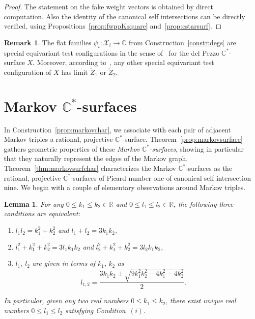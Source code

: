 \documentclass[10pt,a4paper]{amsart}
\newtheorem{lem}[thm]{Lemma}
\theoremstyle{definition}
\newtheorem{rem}[thm]{Remark}
\def\CC{{\mathbb C}}
\def\RR{{\mathbb R}}
\begin{document}
\begin{proof}
The statement on the fake weight vectors is
obtained by direct computation.
Also the identity of the canonical self
intersections can be directly verified,
using Propositions~\ref{prop:fwppKsquare}
and~\ref{prop:cstarsurf}.
\end{proof}


\begin{rem}
The flat families $\psi_i \colon \mathcal{X}_i \to \CC$
from Construction~\ref{constr:degs} are special equivariant
test configurations in the sense of~\cite[Definition~5.2]{HaHaSu}
for the del Pezzo $\CC^*$-surface $X$.
Moreover, according to~\cite[Proposition~5.4]{HaHaSu},
any other special equivariant test configuration of
$X$ has limit $\tilde Z_1$ or $\tilde Z_2$.
\end{rem}




\section[Markov C\^{}*-surfaces]{Markov $\boldsymbol{\CC^*}$-surfaces}

In Construction~\ref{prop:markovchar}, we associate
with each pair of adjacent Markov triples
a rational, projective $\CC^*$-surface.
Theorem~\ref{prop:markovsurface} gathers geometric
properties of these \emph{Markov $\CC^*$-surfaces},
showing in particular that they naturally represent
the edges of the Markov graph.
Theorem~\ref{thm:markovsurfchar}
characterizes the Markov $\CC^*$-surfaces
as the rational, projective $\CC^*$-surfaces
of Picard number one of canonical self intersection
nine.
We begin with a couple of elementary observations
around Markov triples.



\begin{lem}
\label{lem:markovchar}
For any $0 \le k_1 \le k_2 \in \RR$ and $0 \le l_1 \le l_2 \in \RR$,
the following three conditions are equivalent:
\begin{enumerate}\itemsep=0pt
\item[$(i)$]
$l_1l_2 = k_1^2 + k_2^2$ and $l_1+l_2 = 3k_1k_2$,
\item[$(ii)$]
$l_1^2 + k_1^2 + k_2^2 = 3l_1k_1k_2$ and $l_2^2 + k_1^2 + k_2^2 = 3l_2k_1k_2$,
\item[$(iii)$]
$l_1$, $l_2$ are given in terms of $k_1$, $k_2$ as
\[
l_{1,2} = \frac{3k_1k_2 \pm \sqrt{9k_1^2k_2^2 - 4k_1^2 - 4k_2^2}}{2}.
\]
\end{enumerate}
In particular, given any two real numbers $0 \le k_1 \le k_2$,
there exist unique real numbers $0 \le l_1 \le l_2$
satisfying Condition~$(i)$.
\end{lem}
\end{document}
